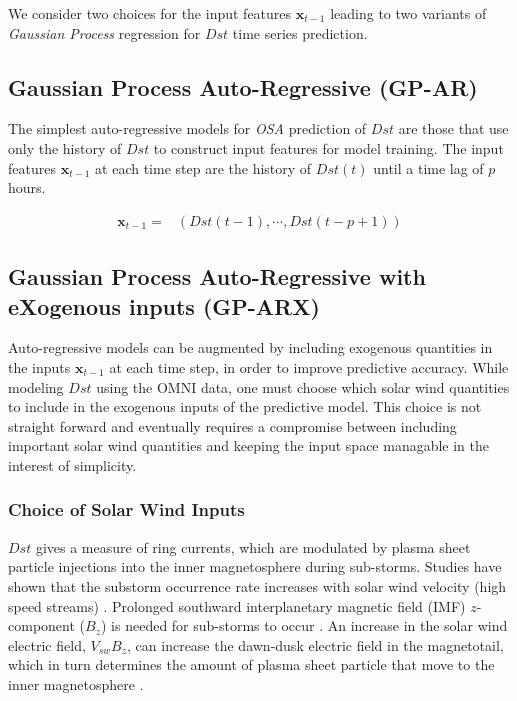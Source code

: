We consider two choices for the input features $\mathbf{x}_{t-1}$ leading to two variants of \emph{Gaussian Process} regression for $Dst$ time series prediction.

\subsection{Gaussian Process Auto-Regressive (GP-AR)} \label{sec:gpar}

The simplest auto-regressive models for \emph{OSA} prediction of $Dst$ are those that use only the history of $Dst$ to construct input features for model training. The input features $\mathbf{x}_{t-1}$ at each time step are the history of $Dst(t)$ until a time lag of $p$ hours.

\begin{align*}
    \mathbf{x}_{t-1} = & \left(Dst(t-1), \cdots , Dst(t-p+1)\right)
\end{align*}

\subsection{Gaussian Process Auto-Regressive with eXogenous inputs (GP-ARX)} \label{sec:gparx}

Auto-regressive models can be augmented by including exogenous quantities in the inputs $\mathbf{x}_{t-1}$ at each time step, in order to improve predictive accuracy. While modeling $Dst$ using the OMNI data, one must choose which solar wind quantities to include in the exogenous inputs of the predictive model. This choice is not straight forward and eventually requires a compromise between including important solar wind quantities and keeping the input space managable in the interest of simplicity.

\subsubsection{Choice of Solar Wind Inputs}

$Dst$ gives a measure of ring currents, which are modulated by plasma sheet particle injections into the inner magnetosphere during sub-storms. Studies have shown that the substorm occurrence rate increases with solar wind velocity (high speed streams) \cite{Kissinger2011,Newell2016}. Prolonged southward interplanetary magnetic field (IMF) $z$-component ($B_z$) is needed for sub-storms to occur \cite{McPherron1986}. An increase in the solar wind electric field, $V_{sw}B_z$, can increase the dawn-dusk electric field in the magnetotail, which in turn determines the amount of plasma sheet particle that move to the inner magnetosphere \cite{Friedel2001}. 

